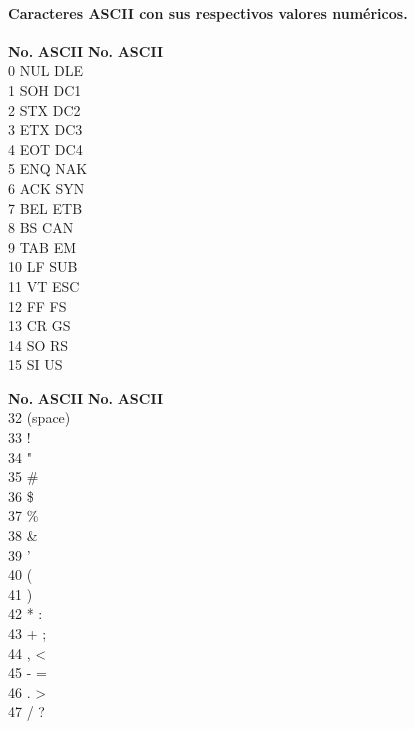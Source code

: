 \paragraph{Caracteres ASCII con sus respectivos valores num\'ericos.}


\begin{tabbing}
\textbf{No.}\hspace{1cm} \=  \textbf{ASCII}\hspace{2cm} \= \textbf{No.}\hspace{1cm} \= \textbf{ASCII}\hspace{2cm}  \\ 
0 \> NUL  \> DLE \\
1 \> SOH  \> DC1 \\
2 \> STX  \> DC2 \\
3 \> ETX  \> DC3 \\
4 \> EOT  \> DC4 \\
5 \> ENQ  \> NAK \\
6 \> ACK  \> SYN \\
7 \> BEL  \> ETB \\
8 \> BS  \> CAN \\
9 \> TAB  \> EM \\
10 \> LF  \> SUB \\
11 \> VT  \> ESC \\
12 \> FF  \> FS \\
13 \> CR  \> GS \\
14 \> SO  \> RS \\
15 \> SI  \> US \\ 
\end{tabbing}


\begin{tabbing}
\textbf{No.}\hspace{1cm} \=  \textbf{ASCII}\hspace{2cm} \= \textbf{No.}\hspace{1cm} \= \textbf{ASCII}\hspace{2cm}  \\ 
32 \> (space)   \\
33 \> !   \\
34 \> "   \\
35 \> \#   \\
36 \> \$   \\
37 \> \%   \\
38 \> \&   \\
39 \> '   \\
40 \> (   \\
41 \> )   \\
42 \> *  \> : \\
43 \> +  \> ; \\
44 \> ,  \> < \\
45 \> -  \> = \\
46 \> .  \> > \\
47 \> /  \> ? \\ 
\end{tabbing}

